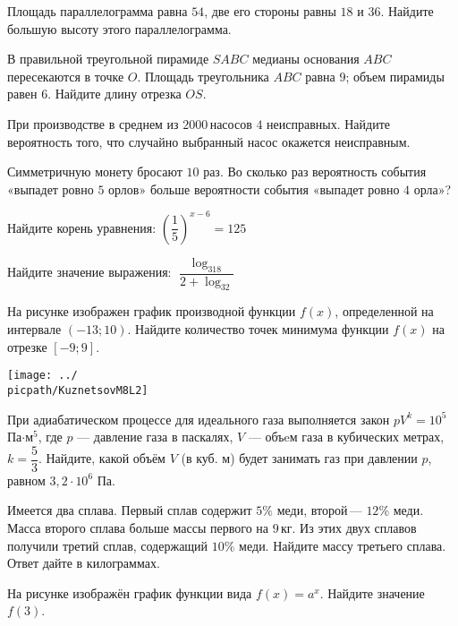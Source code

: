 \begin{class}[number=2]
	\begin{listofex}
		\item Площадь параллелограмма равна \( 54 \), две его стороны равны \( 18 \) и \( 36 \). Найдите большую высоту этого параллелограмма.
		\item В правильной треугольной пирамиде \( SABC \) медианы основания \( ABC \) пересекаются в точке \( O \). Площадь треугольника \( ABC \) равна \( 9 \); объем пирамиды равен \( 6 \). Найдите длину отрезка \( OS \).
		\item При производстве в среднем из \( 2000 \) насосов \( 4 \) неисправных. Найдите вероятность того, что случайно выбранный насос окажется неисправным.
		\item Симметричную монету бросают \( 10 \) раз. Во сколько раз вероятность события «выпадет ровно \( 5 \) орлов» больше вероятности события «выпадет ровно \( 4 \) орла»?
		\item Найдите корень уравнения: \( \left( \dfrac{1}{5} \right)^{x-6}=125 \)
		\item Найдите значение выражения: \( \dfrac{\log_318}{2+\log_32} \)
		\item На рисунке изображен график производной функции \( f(x) \), определенной на интервале \( (-13; 10) \). Найдите количество точек минимума функции \( f(x) \) на отрезке \( [-9;9] \).
		\begin{center}
			\texttt{[image: ../\\picpath/KuznetsovM8L2]}
		\end{center}
		\item При адиабатическом процессе для идеального газа выполняется закон \(pV^k=10^5\)Па\(\cdot\)м\(^5\), где \(p\) --- давление газа в паскалях, \(V\) --- объeм газа в кубических метрах, \(k=\dfrac{  5}{ 3 }\).  Найдите, какой объём \(V\) (в куб. м) будет занимать газ при давлении \(p\), равном \(3,2\cdot10^6\) Па.
		\item Имеется два сплава. Первый сплав содержит \( 5\% \) меди, второй --- \( 12\% \) меди. Масса второго сплава больше массы первого на \( 9 \) кг. Из этих двух сплавов получили третий сплав, содержащий \( 10\% \) меди. Найдите массу третьего сплава. Ответ дайте в килограммах.
		\item
		\begin{minipage}[t]{\bodywidth}
			На рисунке изображён график функции вида \(f(x)= a^x\). Найдите значение \(f(3)\).
		\end{minipage}

\end{listofex}
\end{class}
